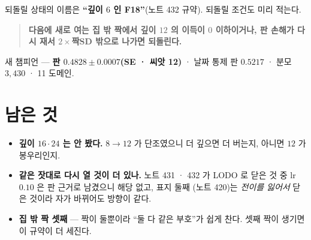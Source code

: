 \documentclass[11pt]{article}
\begin{document}
되돌릴 상태의 이름은 \textbf{``깊이 $6$ 인 F18''}(노트 432 규약).
되돌릴 조건도 미리 적는다.

\begin{quote}
\textbf{다음에 새로 여는 집 밖 짝에서 깊이 $12$ 의 이득이 $0$ 이하이거나,
판 손해가 다시 재서 $2\times$짝SD 밖으로 나가면 되돌린다.}
\end{quote}

새 챔피언 --- \textbf{판 $0.4828 \pm 0.0007$(SE · 씨앗 12)} · 날짜 통제 판
$0.5217$ · 분모 $3{,}430$ · 11 도메인.

\section*{남은 것}

\begin{itemize}
\item \textbf{깊이 $16 \cdot 24$ 는 안 봤다.} $8 \to 12$ 가 단조였으니
더 깊으면 더 버는지, 아니면 $12$ 가 봉우리인지.
\item \textbf{같은 잣대로 다시 열 것이 더 있나.} 노트 431 · 432 가 LODO
로 닫은 것 중 lr $0.10$ 은 판 근거로 남겼으니 해당 없고, 표지 둘째
(노트 420)는 \emph{전이를 잃어서} 닫은 것이라 자가 바뀌어도 방향이 같다.
\item \textbf{집 밖 짝 셋째} --- 짝이 둘뿐이라 ``둘 다 같은 부호''가
쉽게 찬다. 셋째 짝이 생기면 이 규약이 더 세진다.
\end{itemize}
\end{document}
